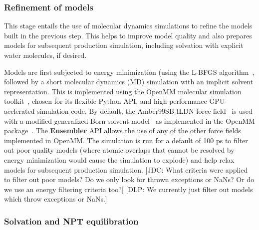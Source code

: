 \documentclass[aps,pre,twocolumn,nofootinbib,superscriptaddress,linenumbers]{revtex4-1}
\begin{document}
\subsubsection*{Refinement of models}

This stage entails the use of molecular dynamics simulations to refine the models built in the previous step.
This helps to improve model quality and also prepares models for subsequent production simulation, including solvation with explicit water molecules, if desired.

Models are first subjected to energy minimization (using the L-BFGS algorithm~\cite{lbfgs}, followed by a short molecular dynamics (MD) simulation with an implicit solvent representation.
This is implemented using the OpenMM molecular simulation toolkit~\cite{eastman:jctc:2012:openmm}, chosen for its flexible Python API, and high performance GPU-acclerated simulation code.
By default, the Amber99SB-ILDN force field~\cite{amber99sb-ildn} is used with a modified generalized Born solvent model~\cite{gbsa-obc1} as implemented in the OpenMM package~\cite{eastman:jctc:2012:openmm}.
The {\bf Ensembler} API allows the use of any of the other force fields implemented in OpenMM.
The simulation is run for a default of 100 ps to filter out poor quality models (where atomic overlaps that cannot be resolved by energy minimization would cause the simulation to explode) and help relax models for subsequent production simulation.
{\color{red}[JDC: What criteria were applied to filter out poor models?  Do we only look for thrown exceptions or NaNs?  Or do we use an energy filtering criteria too?]}
{\color{blue}[DLP: We currently just filter out models which throw exceptions or NaNs.]}

\subsubsection*{Solvation and NPT equilibration}
\end{document}
